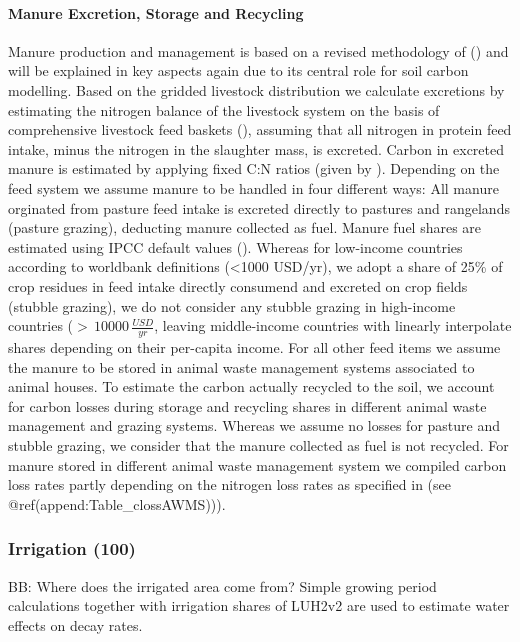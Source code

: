 \documentclass[gc, manuscript]{copernicus}
\begin{document}
\paragraph{Manure Excretion, Storage and Recycling}

Manure production and management is based on a revised methodology of
(\citep{bodirsky2012}) and will be explained in key aspects again due to
its central role for soil carbon modelling. Based on the gridded
livestock distribution we calculate excretions by estimating the
nitrogen balance of the livestock system on the basis of comprehensive
livestock feed baskets (\citep{weindl}), assuming that all nitrogen in
protein feed intake, minus the nitrogen in the slaughter mass, is
excreted. Carbon in excreted manure is estimated by applying fixed C:N
ratios (given by \citep[(][]{ipcc_2019_2019}). Depending on the feed
system we assume manure to be handled in four different ways: All manure
orginated from pasture feed intake is excreted directly to pastures and
rangelands (pasture grazing), deducting manure collected as fuel. Manure
fuel shares are estimated using IPCC default values
(\citet{ippc_2006_2006}). Whereas for low-income countries according to
worldbank definitions (\textless1000 USD/yr), we adopt a share of 25\%
of crop residues in feed intake directly consumend and excreted on crop
fields (stubble grazing), we do not consider any stubble grazing in
high-income countries (\(>\,10000\,\tfrac{USD}{yr}\), leaving
middle-income countries with linearly interpolate shares depending on
their per-capita income. For all other feed items we assume the manure
to be stored in animal waste management systems associated to animal
houses. To estimate the carbon actually recycled to the soil, we account
for carbon losses during storage and recycling shares in different
animal waste management and grazing systems. Whereas we assume no losses
for pasture and stubble grazing, we consider that the manure collected
as fuel is not recycled. For manure stored in different animal waste
management system we compiled carbon loss rates partly depending on the
nitrogen loss rates as specified in \citep{bodirsky2012} (see
@ref(append:Table\_clossAWMS))).

\subsubsection{Irrigation (100)}

BB: Where does the irrigated area come from? Simple growing period
calculations together with irrigation shares of LUH2v2 are used to
estimate water effects on decay rates.
\end{document}
